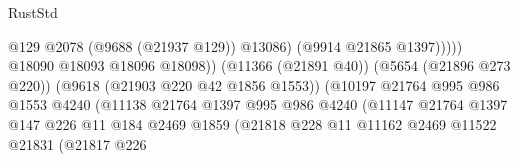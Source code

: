 \begin{lexlean}{RustStd}
\begin{coremodule}
                                                              @129
                                                              @2078
                                                              (@9688 (@21937 @129))
                                                              @13086)
                                                            (@9914 @21865 @1397)))))
                                                    @18090
                                                    @18093
                                                    @18096
                                                    @18098))
                                                (@11366 (@21891 @40))
                                                (@5654 (@21896 @273 @220))
                                                (@9618 (@21903 @220 @42 @1856 @1553))
                                                (@10197
                                                  @21764
                                                  @995
                                                  @986
                                                  @1553
                                                  @4240
                                                  (@11138
                                                    @21764
                                                    @1397
                                                    @995
                                                    @986
                                                    @4240
                                                    (@11147
                                                      @21764
                                                      @1397
                                                      @147
                                                      @226
                                                      @11
                                                      @184
                                                      @2469
                                                      @1859
                                                      (@21818
                                                        @228
                                                        @11
                                                        @11162
                                                        @2469
                                                        @11522
                                                        @21831
                                                        (@21817
                                                          @226

\end{coremodule}
\end{lexlean}
